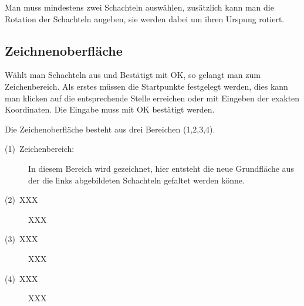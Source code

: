 Man muss mindestens zwei Schachteln auswählen, zusätzlich kann man die Rotation der Schachteln angeben, sie werden dabei um ihren Urspung rotiert.


\subsection{Zeichnenoberfläche}
\label{subsec:zeichenoberflaeche}

Wählt man Schachteln aus und Bestätigt mit OK, so gelangt man zum Zeichenbereich. Als erstes müssen die Startpunkte festgelegt werden, dies kann man klicken auf die entsprechende Stelle erreichen oder mit Eingeben der exakten Koordinaten. Die Eingabe muss mit OK bestätigt werden.

Die Zeichenoberfläche besteht aus drei Bereichen (1,2,3,4).

  \begin{description}
    \item [{(1)~Zeichenbereich:}] In diesem Bereich wird gezeichnet, hier     entsteht die neue Grundfläche aus der die links abgebildeten Schachteln   gefaltet werden könne.
    \item [(2)~XXX] XXX
    \item [(3)~XXX] XXX
    \item [(4)~XXX] XXX
  \end{description}

